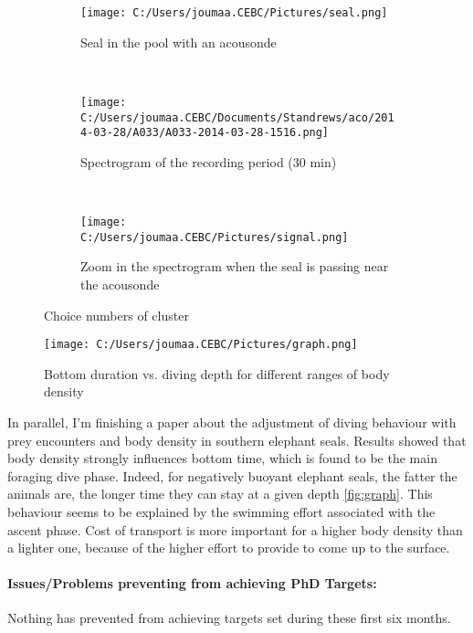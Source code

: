 \documentclass[12pt,a4paper]{report}
\begin{document}
\begin{figure}[h]
	\centering
	\begin{subfigure}[h]{.3\textwidth}
		\texttt{[image: C:/Users/joumaa.CEBC/Pictures/seal.png]}
		\caption{Seal in the pool with an acousonde} 
		\label{subfig:sealPool} 
	\end{subfigure}
	~
	\begin{subfigure}[h]{.3\textwidth}
		\texttt{[image: C:/Users/joumaa.CEBC/Documents/Standrews/aco/2014-03-28/A033/A033-2014-03-28-1516.png]}
		\caption{Spectrogram of the recording period (30 min)}
		\label{subfig:sealSpectro}
	\end{subfigure}
	~
	\begin{subfigure}[h]{.3\textwidth}
		\texttt{[image: C:/Users/joumaa.CEBC/Pictures/signal.png]}
		\caption{Zoom in the spectrogram when the seal is passing near the acousonde}
		\label{subfig:sealZoom}		
	\end{subfigure}
	\caption{Choice numbers of cluster} 

\end{figure}

\begin{figure}[h]
\centering
\texttt{[image: C:/Users/joumaa.CEBC/Pictures/graph.png]}
\caption{Bottom duration vs. diving depth for different ranges of body density} 
\label{fig:graph} 
\end{figure}

In parallel, I’m finishing a paper about the adjustment of diving behaviour with prey encounters and body density in southern elephant seals. Results showed that body density strongly influences bottom time, which is found to be the main foraging dive phase. Indeed, for negatively buoyant elephant seals, the fatter the animals are, the longer time they can stay at a given depth \autoref{fig:graph}. This behaviour seems to be explained by the swimming effort associated with the ascent phase. Cost of transport is more important for a higher body density than a lighter one, because of the higher effort to provide to come up to the surface.

\paragraph{Issues/Problems preventing from achieving PhD Targets:} 
Nothing has prevented from achieving targets set during these first six months.
\end{document}
